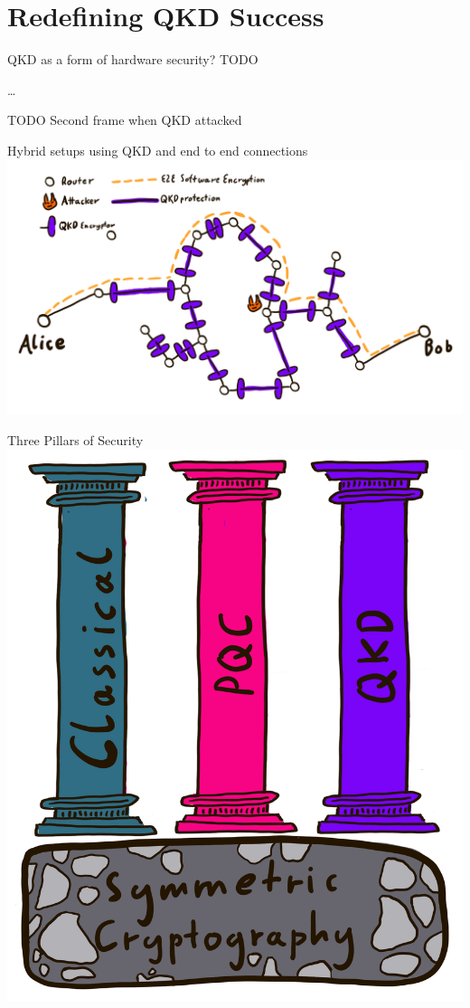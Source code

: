 \section{Redefining QKD Success}

\begin{frame}{QKD as a form of hardware security?}
  TODO

  …

  TODO Second frame when QKD attacked
\end{frame}

\begin{frame}{Hybrid setups using QKD and end to end connections}
  \centering
  \includegraphics[height=.9\textheight]{graphics/qkd-pqc-network.png}
\end{frame}

\begin{frame}{Three Pillars of Security}
  \centering
  \includegraphics[height=.9\textheight]{graphics/Three pillars of hybrid qkd.png}
\end{frame}
